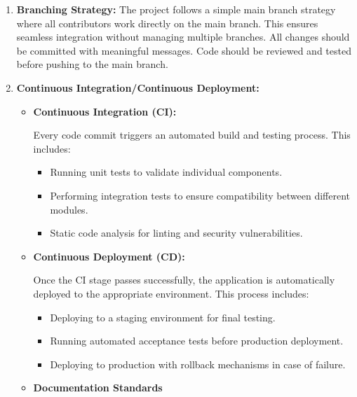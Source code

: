 \documentclass{llncs}
\begin{document}
\begin{enumerate}
    \item \textbf{Branching Strategy:} \newline 
     The project follows a simple main branch strategy where all contributors work directly on the main branch.  
    This ensures seamless integration without managing multiple branches. All changes should be committed with meaningful messages.  
    Code should be reviewed and tested before pushing to the main branch.
\end{enumerate}

\begin{enumerate}
    \setcounter{enumi}{1}
    \item \textbf{Continuous Integration/Continuous Deployment:}  
    \begin{itemize}
        \item \textbf{Continuous Integration (CI):}  
        
        Every code commit triggers an automated build and testing process. This includes:
        \begin{itemize}
            \item Running unit tests to validate individual components.
            \item Performing integration tests to ensure compatibility between different modules.
            \item Static code analysis for linting and security vulnerabilities.
        \end{itemize}

        \bigskip %
        \item \textbf{Continuous Deployment (CD):}  
        
        Once the CI stage passes successfully, the application is automatically deployed to the appropriate environment. This process includes:
        \begin{itemize}
            \item Deploying to a staging environment for final testing.
            \item Running automated acceptance tests before production deployment.
            \item Deploying to production with rollback mechanisms in case of failure.
        \end{itemize}

        \bigskip %

        \item \textbf{Documentation Standards}
    \end{itemize}
\end{enumerate}
\end{document}
